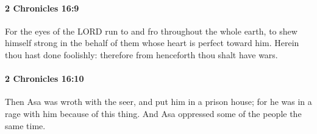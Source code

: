 		\paragraph{2 Chronicles 16:9} %
			\label{2CHRONICLES-16-9}

			For the eyes of the LORD run to and fro throughout the whole earth, to shew himself strong in the behalf of them whose heart is perfect toward him. Herein thou hast done foolishly: therefore from henceforth thou shalt have wars.


		\paragraph{2 Chronicles 16:10} %
			\label{2CHRONICLES-16-10}

			Then Asa was wroth with the seer, and put him in a prison house; for he was in a rage with him because of this thing. And Asa oppressed some of the people the same time.

